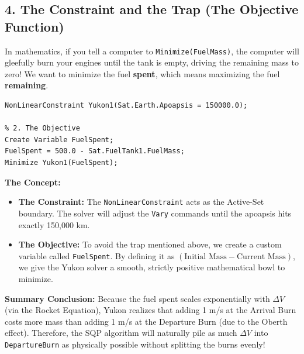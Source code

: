 \documentclass[11pt, letterpaper]{article}
\begin{document}
\subsection*{4. The Constraint and the Trap (The Objective Function)}

\begin{tcolorbox}[colback=red!5!white,colframe=red!75!black,title=The Optimization Trap: What are you actually minimizing?]
In mathematics, if you tell a computer to \texttt{Minimize(FuelMass)}, the computer will gleefully burn your engines until the tank is empty, driving the remaining mass to zero! We want to minimize the fuel \textbf{spent}, which means maximizing the fuel \textbf{remaining}.
\end{tcolorbox}

\begin{lstlisting}[numbers=none]
% 1. The Fence
NonLinearConstraint Yukon1(Sat.Earth.Apoapsis = 150000.0);

% 2. The Objective
Create Variable FuelSpent;
FuelSpent = 500.0 - Sat.FuelTank1.FuelMass;
Minimize Yukon1(FuelSpent);
\end{lstlisting}

\textbf{The Concept:}
\begin{itemize}
    \item \textbf{The Constraint:} The \texttt{NonLinearConstraint} acts as the Active-Set boundary. The solver will adjust the \texttt{Vary} commands until the apoapsis hits exactly 150,000 km.
    \item \textbf{The Objective:} To avoid the trap mentioned above, we create a custom variable called \texttt{FuelSpent}. By defining it as $(\text{Initial Mass} - \text{Current Mass})$, we give the Yukon solver a smooth, strictly positive mathematical bowl to minimize. 
\end{itemize}

\textbf{Summary Conclusion:} 
Because the fuel spent scales exponentially with $\Delta V$ (via the Rocket Equation), Yukon realizes that adding 1 m/s at the Arrival Burn costs more mass than adding 1 m/s at the Departure Burn (due to the Oberth effect). Therefore, the SQP algorithm will naturally pile as much $\Delta V$ into \texttt{DepartureBurn} as physically possible without splitting the burns evenly!
\end{document}
